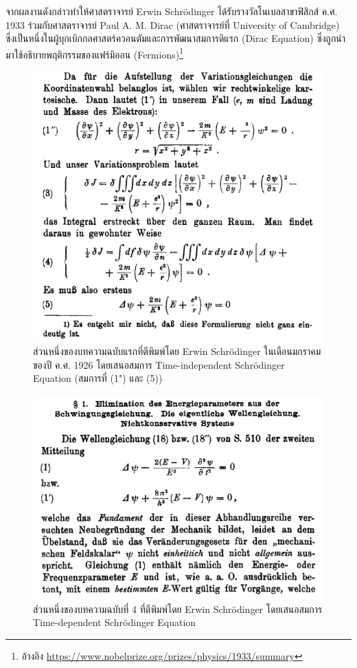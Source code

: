 จากผลงานดังกล่าวทำให้ศาสตราจารย์ Erwin Schr\"{o}dinger ได้รับรางวัลโนเบลสาขาฟิสิกส์ ค.ศ. 1933 ร่วมกับศาสตราจารย์ Paul A. M. Dirac (ศาสตราจารย์ที่ University of Cambridge) ซึ่งเป็นหนึ่งในผู้บุกเบิกกลศาสตร์ควอนตัมและการพัฒนาสมการดิแรก (Dirac Equation) ซึ่งถูกนำมาใช้อธิบายพฤติกรรมของแฟร์มิออน (Fermions)\footnote{อ้างอิง \url{https://www.nobelprize.org/prizes/physics/1933/summary}}

\begin{figure}[H]
    \centering
    \includegraphics[width=0.7\linewidth]{fig/time-inde-schrodinger-eq.png}
    \caption{ส่วนหนึ่งของบทความฉบับแรกที่ตีพิมพ์โดย Erwin Schr\"{o}dinger ในเดือนมกราคมของปี ค.ศ. 1926 โดยเสนอสมการ Time-independent Schr\"{o}dinger Equation (สมการที่ (1") และ (5))}
    \label{fig:schrodinger_paper_1}
\end{figure}
%
\begin{figure}[H]
    \centering
    \includegraphics[width=0.7\linewidth]{fig/time-dep-schrodinger-eq.png}
    \caption{ส่วนหนึ่งของบทความฉบับที่ 4 ที่ตีพิมพ์โดย Erwin Schr\"{o}dinger โดยเสนอสมการ Time-dependent Schr\"{o}dinger Equation}
    \label{fig:schrodinger_paper_4}
\end{figure}

